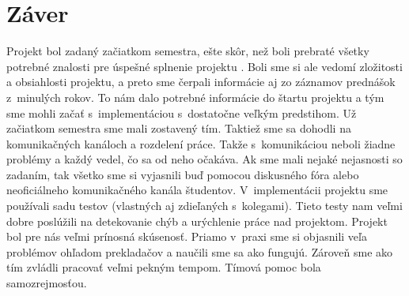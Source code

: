 \documentclass[a4paper, 11pt]{article}
\begin{document}
    \section{Záver}
    Projekt bol zadaný začiatkom semestra, ešte skôr, než boli prebraté všetky potrebné znalosti pre
    úspešné splnenie projektu . Boli sme si ale vedomí zložitosti a obsiahlosti projektu,
    a preto sme čerpali informácie aj zo záznamov prednášok z~minulých rokov. To nám dalo potrebné informácie do
    štartu projektu a tým sme mohli začať s~implementáciou s~dostatočne veľkým predstihom.
    Už začiatkom semestra sme mali zostavený tím. Taktiež sme sa dohodli na komunikačných kanáloch a rozdelení práce. Takže
    s~komunikáciou neboli žiadne problémy a každý vedel, čo sa od neho očakáva.
    Ak sme mali nejaké nejasnosti so zadaním, tak všetko sme si vyjasnili buď pomocou diskusného fóra alebo
    neoficiálneho komunikačného kanála študentov. V~implementácii projektu sme používali sadu testov
    (vlastných aj zdieľaných s~kolegami).
    Tieto testy nam veľmi dobre poslúžili na detekovanie chýb a urýchlenie práce nad projektom.
    Projekt bol pre nás veľmi prínosná skúsenosť. Priamo v~praxi sme si objasnili veľa problémov ohľadom prekladačov a naučili sme sa ako fungujú.
    Zároveň sme ako tím zvládli pracovať veľmi pekným tempom. Tímová pomoc bola samozrejmosťou.



    \clearpage
    
    \renewcommand{\refname}{Literatura}
    



    \clearpage


\end{document}
